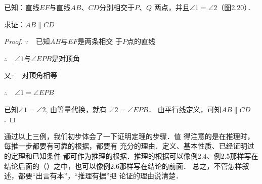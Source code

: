 \begin{example}
	已知：直线$EF$与直线$AB$、$CD$分别相交于$P$、$Q$
两点，并且$\angle 1=\angle 2$（图2.20）．

求证：$AB\parallel CD$
\end{example}

\begin{figure}[htp]
	\centering
{}
	\caption{}
\end{figure}
	

\begin{proof}
$\because\quad $已知$AB$与$EF$是两条相交
于$P$点的直线

$\therefore\quad \angle 1$与$\angle EPB$是对顶角

又$\because\quad $对顶角相等

$\therefore\quad \angle 1=\angle EPB$

已知$\angle 1=\angle 2$, 由等量代换，就有
$\angle 2=\angle EPB$．
由平行线定义，可知$AB\parallel CD$.
\end{proof}

通过以上三例，我们初步体会了一下证明定理的步骤．值
得注意的是在推理时，每推一步都要有可靠的根据，都要有
充分的理由．定义、基本性质、已经证明过的定理和已知条件
都可作为推理的根据．推理的根据可以像例2.4、例2.5那样写在
结论后面的（\qquad）之中，也可以像例2.6那样写在结论的前面．
总之，不管怎样叙述，都要“出言有本”，“推理有据”把
论证的理由说清楚．

